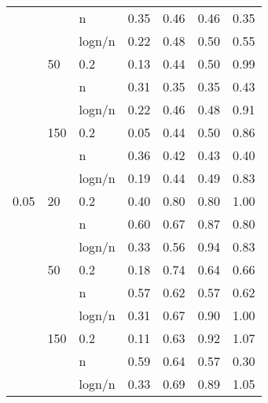 \begin{tabular}{lllrrrr}
     &     & n &   0.35 &         0.46 &               0.46 &            0.35 \\
     &     & logn/n &   0.22 &         0.48 &               0.50 &            0.55 \\
     & 50  & 0.2 &   0.13 &         0.44 &               0.50 &            0.99 \\
     &     & n &   0.31 &         0.35 &               0.35 &            0.43 \\
     &     & logn/n &   0.22 &         0.46 &               0.48 &            0.91 \\
     & 150 & 0.2 &   0.05 &         0.44 &               0.50 &            0.86 \\
     &     & n &   0.36 &         0.42 &               0.43 &            0.40 \\
     &     & logn/n &   0.19 &         0.44 &               0.49 &            0.83 \\
0.05 & 20  & 0.2 &   0.40 &         0.80 &               0.80 &            1.00 \\
     &     & n &   0.60 &         0.67 &               0.87 &            0.80 \\
     &     & logn/n &   0.33 &         0.56 &               0.94 &            0.83 \\
     & 50  & 0.2 &   0.18 &         0.74 &               0.64 &            0.66 \\
     &     & n &   0.57 &         0.62 &               0.57 &            0.62 \\
     &     & logn/n &   0.31 &         0.67 &               0.90 &            1.00 \\
     & 150 & 0.2 &   0.11 &         0.63 &               0.92 &            1.07 \\
     &     & n &   0.59 &         0.64 &               0.57 &            0.30 \\
     &     & logn/n &   0.33 &         0.69 &               0.89 &            1.05 \\
\bottomrule
\end{tabular}
